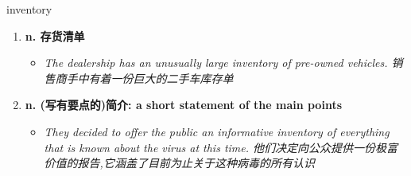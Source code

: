 
\begin{frame}
{\huge inventory}
\begin{center}
\begin{enumerate}\Large
  \item \textbf{n. 存货清单}
  \begin{itemize}
    \item \em{\Large{The dealership has an unusually large inventory of pre-owned vehicles. 销售商手中有着一份巨大的二手车库存单}}
  \end{itemize}
  \item \textbf{n. (写有要点的)简介: a short statement of the main points}
  \begin{itemize}
    \item \em{\Large{They decided to offer the public an informative inventory of everything that is known about the virus at this time. 他们决定向公众提供一份极富价值的报告,它涵盖了目前为止关于这种病毒的所有认识}}
  \end{itemize}
\end{enumerate}
\end{center}
\end{frame}
